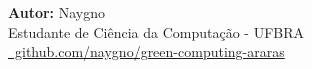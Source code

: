 \documentclass[12pt]{article}
\begin{document}
\vfill

\begin{center}
    \scriptsize
    \textbf{Autor:} Naygno\\[2mm]
    {\small Estudante de Ciência da Computação - UFBRA}\\[2mm]
    \href{https://github.com/naygno/green-computing-araras}{\textcolor{NordText!80}{\faGithub \ github.com/naygno/green-computing-araras}}
\end{center}
\end{document}
